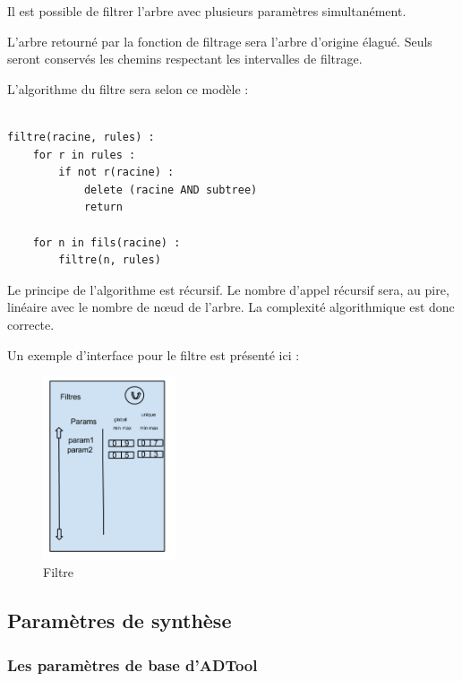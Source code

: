 		Il est possible de filtrer l'arbre avec plusieurs paramètres simultanément.
		
		L'arbre retourné par la fonction de filtrage sera l'arbre d'origine élagué. Seuls seront conservés les chemins respectant les intervalles de filtrage.
		
		L'algorithme du filtre sera selon ce modèle :

		\begin{lstlisting}

filtre(racine, rules) :
	for r in rules :
		if not r(racine) :
			delete (racine AND subtree)
			return

	for n in fils(racine) :
		filtre(n, rules)

\end{lstlisting}
	
		Le principe de l'algorithme est récursif.
		Le nombre d'appel récursif sera, au pire, linéaire avec le nombre de nœud de l'arbre.
		La complexité algorithmique est donc correcte.

		Un exemple d'interface pour le filtre est présenté ici :

		\begin{figure}[h!]
			\begin{center}
				\includegraphics[width=0.35\textwidth]{figure/filtre.png}
			\end{center}
			\caption{Filtre}
			\label{fig:filtre}
		\end{figure}

\subsection{Paramètres de synthèse}

\subsubsection{Les paramètres de base d'ADTool}

